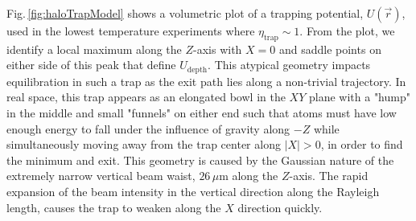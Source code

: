 	
	
	
Fig.\,\ref{fig:haloTrapModel} shows a volumetric plot of a trapping potential, $U(\vec{r})$, used in the lowest temperature experiments where $\eta_\text{trap} \sim 1$.
From the plot, we identify a local maximum along the $Z$-axis with $X=0$ and saddle points on either side of this peak that define $U_\text{depth}$.
This atypical geometry impacts equilibration in such a trap as the exit path lies along a non-trivial trajectory.
In real space, this trap appears as an elongated bowl in the $XY$ plane with a "hump" in the middle and small "funnels" on either end such that atoms must have low enough energy to fall under the influence of gravity along $-Z$ while simultaneously moving away from the trap center along $|X| > 0$, in order to find the minimum and exit.
This geometry is caused by the Gaussian nature of the extremely narrow vertical beam waist, $26\,\mu$m along the $Z$-axis.
The rapid expansion of the beam intensity in the vertical direction along the Rayleigh length, causes the trap to weaken along the $X$ direction quickly.

